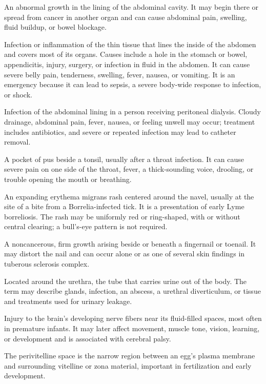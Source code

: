  An abnormal growth in the lining of the abdominal cavity. It may begin there or spread from cancer in another organ and can cause abdominal pain, swelling, fluid buildup, or bowel blockage.

 Infection or inflammation of the thin tissue that lines the inside of the abdomen and covers most of its organs. Causes include a hole in the stomach or bowel, appendicitis, injury, surgery, or infection in fluid in the abdomen. It can cause severe belly pain, tenderness, swelling, fever, nausea, or vomiting. It is an emergency because it can lead to sepsis, a severe body-wide response to infection, or shock.

 Infection of the abdominal lining in a person receiving peritoneal dialysis. Cloudy drainage, abdominal pain, fever, nausea, or feeling unwell may occur; treatment includes antibiotics, and severe or repeated infection may lead to catheter removal.

 A pocket of pus beside a tonsil, usually after a throat infection. It can cause severe pain on one side of the throat, fever, a thick-sounding voice, drooling, or trouble opening the mouth or breathing.

 An expanding erythema migrans rash centered around the navel, usually at the site of a bite from a Borrelia-infected tick. It is a presentation of early Lyme borreliosis. The rash may be uniformly red or ring-shaped, with or without central clearing; a bull’s-eye pattern is not required.

 A noncancerous, firm growth arising beside or beneath a fingernail or toenail. It may distort the nail and can occur alone or as one of several skin findings in tuberous sclerosis complex.

 Located around the urethra, the tube that carries urine out of the body. The term may describe glands, infection, an abscess, a urethral diverticulum, or tissue and treatments used for urinary leakage.

 Injury to the brain’s developing nerve fibers near its fluid-filled spaces, most often in premature infants. It may later affect movement, muscle tone, vision, learning, or development and is associated with cerebral palsy.

 The perivitelline space is the narrow region between an egg’s plasma membrane and surrounding vitelline or zona material, important in fertilization and early development.

